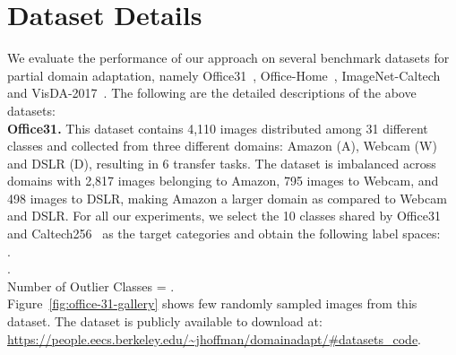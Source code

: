 \documentclass[10pt,twocolumn,letterpaper]{article}
\begin{document}
{\small


}

\clearpage
\appendix
\label{appendix: Appendix}




\section{Dataset Details}
We evaluate the performance of our approach on several benchmark datasets for partial domain adaptation, namely Office31~\cite{saenko2010adapting}, Office-Home~\cite{venkateswara2017deep}, ImageNet-Caltech and VisDA-2017~\cite{peng2017visda}. The following are the detailed descriptions of the above datasets: \\

\vspace{-3mm}
\noindent \textbf{Office31.} This dataset contains 4,110 images distributed among 31 different classes and collected from three different domains: Amazon (A), Webcam (W) and DSLR (D), resulting in 6 transfer tasks. The dataset is imbalanced across domains with 2,817 images belonging to Amazon, 795 images to Webcam, and 498 images to DSLR, making Amazon a larger domain as compared to Webcam and DSLR. For all our experiments, we select the 10 classes shared by Office31 and Caltech256~\cite{griffin2007caltech} as the target categories and obtain the following label spaces: \\
.\\
.\\
Number of Outlier Classes = .\\
Figure~\ref{fig:office-31-gallery} shows few randomly sampled images from this dataset. The dataset is publicly available to download at: \url{https://people.eecs.berkeley.edu/~jhoffman/domainadapt/#datasets_code}. 
\end{document}
